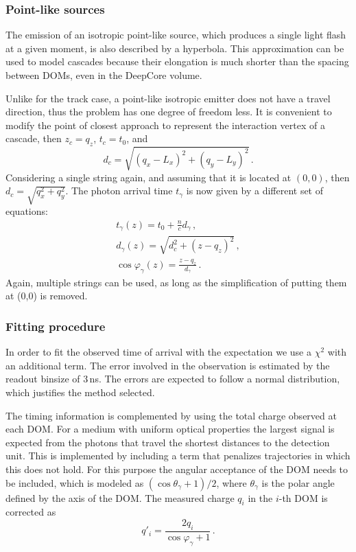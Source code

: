 \documentclass[../Main.tex]{subfiles}
\begin{document}
\subsubsection{Point-like sources}
The emission of an isotropic point-like source, which produces a single light flash at a given moment, is also described by a hyperbola. This approximation can be used to model cascades because their elongation is much shorter than the spacing between DOMs, even in the DeepCore volume.

Unlike for the track case, a point-like isotropic emitter does not have a travel direction, thus the problem has one degree of freedom less. It is convenient to modify the point of closest approach to represent the interaction vertex of a cascade, then $z_c = q_z$, $t_c = t_0$, and 
\begin{equation}
d_c = \sqrt{(q_x - L_x)^2 + (q_y - L_y)^2}\,.
\end{equation}
Considering a single string again, and assuming that it is located at $(0,0)$, then $d_c = \sqrt{q_x^2 + q_y^2}$. The photon arrival time $t_\gamma$ is now given by a different set of equations:
\begin{align}
t_\gamma(z) = t_0 + \frac{n}{c} d_\gamma\,,\\
d_\gamma(z) = \sqrt{d_c^2 + (z-q_z)^2}\,,\\
\cos \varphi_\gamma (z) = \frac{z-q_z}{d_\gamma}\,.
\end{align}
Again, multiple strings can be used, as long as the simplification of putting them at (0,0) is removed.

\subsubsection{Fitting procedure}
In order to fit the observed time of arrival with the expectation we use a $\chi^2$ with an additional term. The error involved in the observation is estimated by the readout binsize of 3\,ns. The errors are expected to follow a normal distribution, which justifies the method selected.

The timing information is complemented by using the total charge observed at each DOM. For a medium with uniform optical properties the largest signal is expected from the photons that travel the shortest distances to the detection unit. This is implemented by including a term that penalizes trajectories in which this does not hold. For this purpose the angular acceptance of the DOM needs to be included, which is modeled as $(\cos \theta_\gamma + 1)/2$, where $\theta_\gamma$ is the polar angle defined by the axis of the DOM. The measured charge $q_i$ in the $i$-th DOM is corrected as
\begin{equation}
q'_i = \frac{2q_i}{\cos \varphi_\gamma + 1}\,.
\end{equation}
\end{document}
